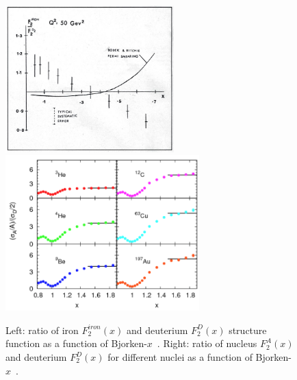 \begin{figure}[!ht]
  \centering
  \includegraphics[width=6.5cm]{FigCap2/EMC.jpg}
  \includegraphics[width=7.5cm]{FigCap2/EMC2.png}
  \caption{Left: ratio of iron $F^{iron}_2(x)$ and deuterium $F^D_2(x)$ structure function as a function of Bjorken-$x$~\cite{Aubert:1983xm}. Right: ratio of nucleus $F^{A}_2(x)$ and deuterium $F^D_2(x)$ for different nuclei as a function of Bjorken-$x$~\cite{Seely:2009gt}.}
  \label{fig:EMC}
\end{figure}




